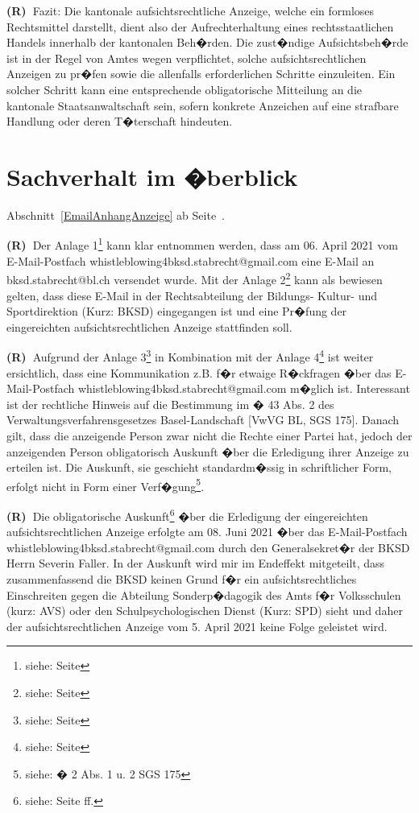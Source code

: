 \documentclass[paper=a4,fontsize=12pt, oneside, numbers=noenddot]{scrbook}
\newcounter{rz}
\newcommand{\Rz}{\addtocounter{rz}{1}\textbf{(R\arabic{rz})~}}
\begin{document}
	\Rz Fazit: Die kantonale aufsichtsrechtliche Anzeige, welche ein formloses Rechtsmittel darstellt, dient also der Aufrechterhaltung eines rechtsstaatlichen Handels innerhalb der kantonalen Beh�rden.  Die zust�ndige Aufsichtsbeh�rde ist in der Regel von Amtes wegen verpflichtet, solche aufsichtsrechtlichen Anzeigen zu pr�fen sowie die allenfalls erforderlichen Schritte einzuleiten. Ein solcher Schritt kann eine entsprechende obligatorische Mitteilung an die kantonale Staatsanwaltschaft sein, sofern konkrete Anzeichen auf eine strafbare Handlung oder deren T�terschaft hindeuten.
	
	
	\chapter{Sachverhalt im �berblick}
	
	Abschnitt~\ref{EmailAnhangAnzeige} ab Seite~\pageref{EmailAnhangAnzeige}.
	
	\Rz Der Anlage 1\footnote{siehe: Seite \pageref{EmailAnhangAnzeige}} kann klar entnommen werden, dass am 06. April 2021 vom E-Mail-Postfach whistleblowing4bksd.stabrecht@gmail.com eine E-Mail an bksd.stabrecht@bl.ch versendet wurde. Mit der Anlage 2\footnote{siehe:  Seite \pageref{EingangAnzeige}} kann als bewiesen gelten, dass diese E-Mail in der Rechtsabteilung der Bildungs- Kultur- und Sportdirektion (Kurz: BKSD) eingegangen ist und eine Pr�fung der eingereichten aufsichtsrechtlichen Anzeige stattfinden soll.
	
	\Rz Aufgrund der Anlage 3\footnote{siehe:  Seite \pageref{NachfrageAnzeige}} in Kombination mit der Anlage 4\footnote{siehe:  Seite \pageref{AntwortNachfrageAnzeige}} ist weiter ersichtlich, dass eine Kommunikation z.B. f�r etwaige R�ckfragen �ber das E-Mail-Postfach whistleblowing4bksd.stabrecht@gmail.com m�glich ist. Interessant ist der rechtliche Hinweis auf die Bestimmung im � 43 Abs. 2 des Verwaltungsverfahrensgesetzes Basel-Landschaft [VwVG BL, SGS 175]. Danach gilt, dass die anzeigende Person zwar nicht die Rechte einer Partei hat, jedoch der anzeigenden Person obligatorisch Auskunft �ber die Erledigung ihrer Anzeige zu erteilen ist. Die Auskunft, sie geschieht  standardm�ssig in schriftlicher Form, erfolgt nicht in Form einer Verf�gung\footnote{siehe: � 2 Abs. 1 u. 2 SGS 175}.
	
	\Rz Die obligatorische Auskunft\footnote{siehe: Seite \pageref{EntscheidAnzeige} ff.} �ber die Erledigung der eingereichten aufsichtsrechtlichen Anzeige erfolgte am 08. Juni 2021 �ber das E-Mail-Postfach whistleblowing4bksd.stabrecht@gmail.com durch den Generalsekret�r der BKSD Herrn Severin Faller. In der Auskunft wird mir im Endeffekt mitgeteilt, dass zusammenfassend die BKSD keinen Grund f�r ein aufsichtsrechtliches Einschreiten gegen die Abteilung Sonderp�dagogik des Amts f�r Volksschulen (kurz: AVS) oder den Schulpsychologischen Dienst (Kurz: SPD) sieht und daher der aufsichtsrechtlichen Anzeige vom 5. April 2021 keine Folge geleistet wird.
	
\end{document}
